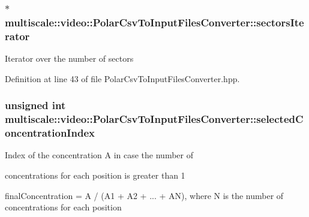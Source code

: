 \hypertarget{classmultiscale_1_1video_1_1PolarCsvToInputFilesConverter_aa6895c1613a551cd05195f05ae51862b}{
\subsubsection[{sectors\-Iterator}]{$\ast$ multiscale\-::video\-::\-Polar\-Csv\-To\-Input\-Files\-Converter\-::sectors\-Iterator\hspace{0.3cm}{\ttfamily [private]}}}\label{classmultiscale_1_1video_1_1PolarCsvToInputFilesConverter_aa6895c1613a551cd05195f05ae51862b}
Iterator over the number of sectors 

Definition at line 43 of file Polar\-Csv\-To\-Input\-Files\-Converter.\-hpp.

\hypertarget{classmultiscale_1_1video_1_1PolarCsvToInputFilesConverter_a121d592659f9f5075c8c78aa46c2950c}{
\subsubsection[{selected\-Concentration\-Index}]{\setlength{\rightskip}{0pt plus 5cm}unsigned int multiscale\-::video\-::\-Polar\-Csv\-To\-Input\-Files\-Converter\-::selected\-Concentration\-Index\hspace{0.3cm}{\ttfamily [private]}}}\label{classmultiscale_1_1video_1_1PolarCsvToInputFilesConverter_a121d592659f9f5075c8c78aa46c2950c}
\begin{DoxyVerb}    Index of the concentration A in case the number of
\end{DoxyVerb}
 concentrations for each position is greater than 1

final\-Concentration = A / (A1 + A2 + ... + A\-N), where N is the number of concentrations for each position 

